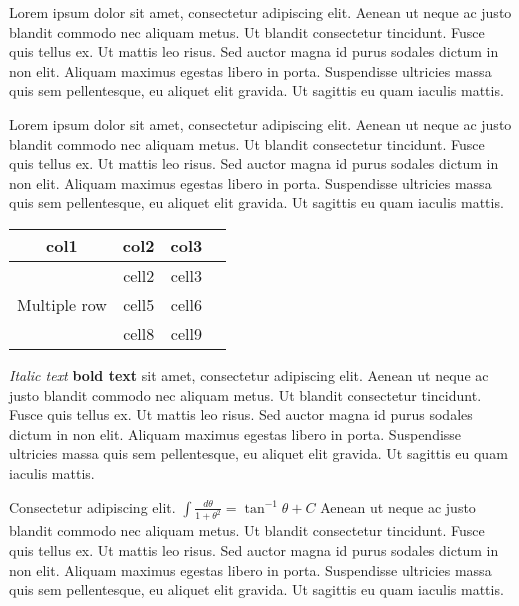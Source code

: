 \documentclass{csmagazine}
\begin{document}
\begin{flushleft}
Lorem ipsum dolor sit amet, consectetur adipiscing elit. Aenean ut neque ac justo blandit commodo nec aliquam metus. Ut blandit consectetur tincidunt. Fusce quis tellus ex. Ut mattis leo risus. Sed auctor magna id purus sodales dictum in non elit. Aliquam maximus egestas libero in porta. Suspendisse ultricies massa quis sem pellentesque, eu aliquet elit gravida. Ut sagittis eu quam iaculis mattis.

Lorem ipsum dolor sit amet, consectetur adipiscing elit. Aenean ut neque ac justo blandit commodo nec aliquam metus. Ut blandit consectetur tincidunt. Fusce quis tellus ex. Ut mattis leo risus. Sed auctor magna id purus sodales dictum in non elit. Aliquam maximus egestas libero in porta. Suspendisse ultricies massa quis sem pellentesque, eu aliquet elit gravida. Ut sagittis eu quam iaculis mattis.


\begin{table}[h!]
	\begin{center}
		\begin{tabular}{ |c|c|c|c| } 
			\hline
			col1 & col2 & col3 \\
			\hline
			\multirow{3}{4em}{Multiple row} & cell2 & cell3 \\ 
			& cell5 & cell6 \\ 
			& cell8 & cell9 \\ 
			\hline
		\end{tabular}
	\end{center}
\end{table}

\textit{Italic text} \textbf{bold text} sit amet, consectetur adipiscing elit. Aenean ut neque ac justo blandit commodo nec aliquam metus. Ut blandit consectetur tincidunt. Fusce quis tellus ex. Ut mattis leo risus. Sed auctor magna id purus sodales dictum in non elit. Aliquam maximus egestas libero in porta. Suspendisse ultricies massa quis sem pellentesque, eu aliquet elit gravida. Ut sagittis eu quam iaculis mattis.

Consectetur adipiscing elit. $\int\frac{d\theta} {1+\theta^2}=\tan^{-1} \theta+C$ Aenean ut neque ac justo blandit commodo nec aliquam metus. Ut blandit consectetur tincidunt. Fusce quis tellus ex. Ut mattis leo risus. Sed auctor magna id purus sodales dictum in non elit. Aliquam maximus egestas libero in porta. Suspendisse ultricies massa quis sem pellentesque, eu aliquet elit gravida. Ut sagittis eu quam iaculis mattis.


\end{flushleft}
\end{document}
